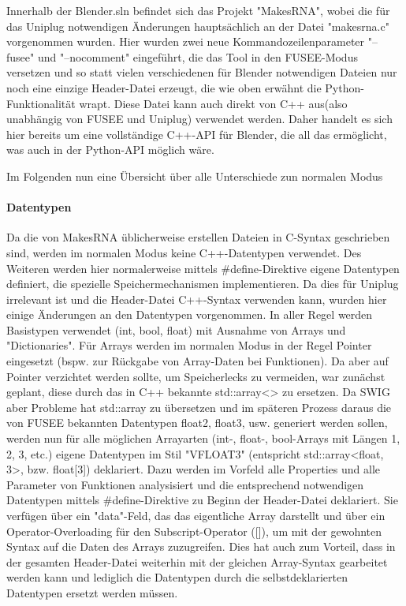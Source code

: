 Innerhalb der Blender.sln befindet sich das Projekt "MakesRNA", wobei die für das Uniplug notwendigen Änderungen hauptsächlich an der Datei "makesrna.c" vorgenommen wurden. Hier wurden zwei neue Kommandozeilenparameter "--fusee" und "--nocomment" eingeführt, die das Tool in den FUSEE-Modus versetzen und so statt vielen verschiedenen für Blender notwendigen Dateien nur noch eine einzige Header-Datei erzeugt, die wie oben erwähnt die Python-Funktionalität wrapt. Diese Datei kann auch direkt von C++ aus(also unabhängig von FUSEE und Uniplug) verwendet werden. Daher handelt es sich hier bereits um eine vollständige C++-API für Blender, die all das ermöglicht, was auch in der Python-API möglich wäre.

Im Folgenden nun eine Übersicht über alle Unterschiede zun normalen Modus

\paragraph{Datentypen}

Da die von MakesRNA üblicherweise erstellen Dateien in C-Syntax geschrieben sind, werden im normalen Modus keine C++-Datentypen verwendet. Des Weiteren werden hier normalerweise mittels \#define-Direktive eigene Datentypen definiert, die spezielle Speichermechanismen implementieren. Da dies für Uniplug irrelevant ist und die Header-Datei C++-Syntax verwenden kann, wurden hier einige Änderungen an den Datentypen vorgenommen. In aller Regel werden Basistypen verwendet (int, bool, float) mit Ausnahme von Arrays und "Dictionaries". Für Arrays werden im normalen Modus in der Regel Pointer eingesetzt (bspw. zur Rückgabe von Array-Daten bei Funktionen). Da aber auf Pointer verzichtet werden sollte, um Speicherlecks zu vermeiden, war zunächst geplant, diese durch das in C++ bekannte std::array<> zu ersetzen. Da SWIG aber Probleme hat std::array zu übersetzen und im späteren Prozess daraus die von FUSEE bekannten Datentypen float2, float3, usw. generiert werden sollen, werden nun für alle möglichen Arrayarten (int-, float-, bool-Arrays mit Längen 1, 2, 3, etc.) eigene Datentypen im Stil "VFLOAT3" (entspricht std::array<float, 3>, bzw. float[3]) deklariert. Dazu werden im Vorfeld alle Properties und alle Parameter von Funktionen analysisiert und die entsprechend notwendigen Datentypen mittels \#define-Direktive zu Beginn der Header-Datei deklariert. Sie verfügen über ein "data"-Feld, das das eigentliche Array darstellt und über ein Operator-Overloading für den Subscript-Operator ([]), um mit der gewohnten Syntax auf die Daten des Arrays zuzugreifen. Dies hat auch zum Vorteil, dass in der gesamten Header-Datei weiterhin mit der gleichen Array-Syntax gearbeitet werden kann und lediglich die Datentypen durch die selbstdeklarierten Datentypen ersetzt werden müssen.


